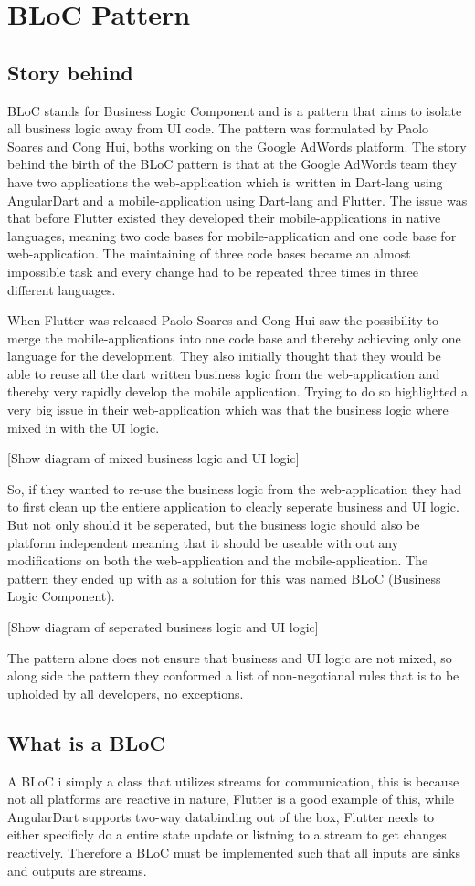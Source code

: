 \section{BLoC Pattern}

\subsection{Story behind}
BLoC stands for Business Logic Component and is a pattern that aims to isolate all
business logic away from UI code. The pattern was formulated by Paolo Soares and
Cong Hui, boths working on the Google AdWords platform. The story behind the birth
of the BLoC pattern is that at the Google AdWords team they have two applications the
web-application which is written in Dart-lang using AngularDart and a mobile-application
using Dart-lang and Flutter. The issue was that before Flutter existed they developed
their mobile-applications in native languages, meaning two code bases for mobile-application
and one code base for web-application. The maintaining of three code bases became an
almost impossible task and every change had to be repeated three times in three
different languages.

When Flutter was released Paolo Soares and Cong Hui saw the possibility to merge the
mobile-applications into one code base and thereby achieving only one language for the
development. They also initially thought that they would be able to reuse all the dart
written business logic from the web-application and thereby very rapidly develop the
mobile application. Trying to do so highlighted a very big issue in their web-application
which was that the business logic where mixed in with the UI logic.

[Show diagram of mixed business logic and UI logic]

So, if they wanted to re-use the business logic from the web-application they had to
first clean up the entiere application to clearly seperate business and UI logic. But
not only should it be seperated, but the business logic should also be platform independent
meaning that it should be useable with out any modifications on both the web-application
and the mobile-application. The pattern they ended up with as a solution for this was
named BLoC (Business Logic Component).

[Show diagram of seperated business logic and UI logic]

The pattern alone does not ensure that business and UI logic are not mixed, so along
side the pattern they conformed a list of non-negotianal rules that is to be upholded
by all developers, no exceptions.

\subsection{What is a BLoC}
A BLoC i simply a class that utilizes streams for communication, this is because
not all platforms are reactive in nature, Flutter is a good example of this, while
AngularDart supports two-way databinding out of the box, Flutter needs to either specificly
do a entire state update or listning to a stream to get changes reactively. Therefore
a BLoC must be implemented such that all inputs are sinks and outputs are streams.

